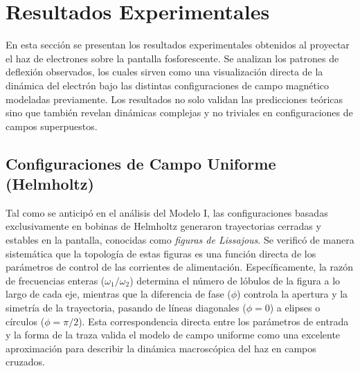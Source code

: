 \chapter{Resultados Experimentales}
\label{sec:resultados}

En esta sección se presentan los resultados experimentales obtenidos al
proyectar el haz de electrones sobre la pantalla fosforescente. Se
analizan los patrones de deflexión observados, los cuales sirven como una
visualización directa de la dinámica del electrón bajo las distintas
configuraciones de campo magnético modeladas previamente. Los resultados no
solo validan las predicciones teóricas sino que también revelan dinámicas
complejas y no triviales en configuraciones de campos superpuestos.

\section{Configuraciones de Campo Uniforme (Helmholtz)}

Tal como se anticipó en el análisis del Modelo I, las configuraciones
basadas exclusivamente en bobinas de Helmholtz generaron trayectorias
cerradas y estables en la pantalla, conocidas como \emph{figuras de Lissajous}.
Se verificó de manera sistemática que la topología de estas figuras es
una función directa de los parámetros de control de las corrientes de
alimentación. Específicamente, la razón de frecuencias enteras
($\omega_1/\omega_2$) determina el número de lóbulos de la figura a lo
largo de cada eje, mientras que la diferencia de fase ($\phi$) controla la
apertura y la simetría de la trayectoria, pasando de líneas diagonales
($\phi=0$) a elipses o círculos ($\phi=\pi/2$). Esta correspondencia
directa entre los parámetros de entrada y la forma de la traza valida el
modelo de campo uniforme como una excelente aproximación para describir la
dinámica macroscópica del haz en campos cruzados.

